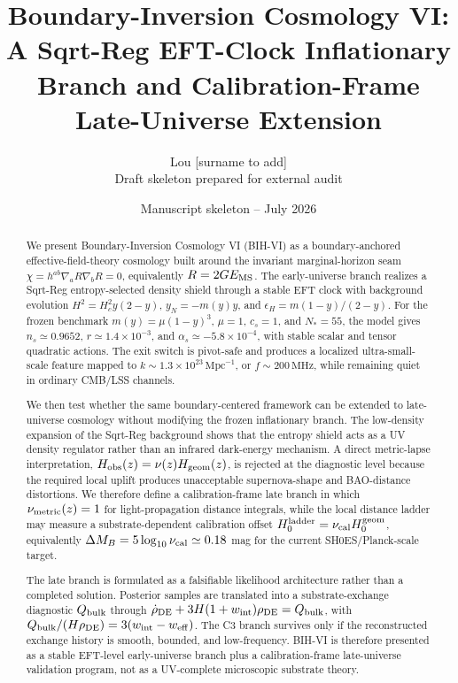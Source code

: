 \documentclass[11pt]{article}
\title{Boundary-Inversion Cosmology VI:\\A Sqrt-Reg EFT-Clock Inflationary Branch and Calibration-Frame Late-Universe Extension}
\author{Lou [surname to add]\\\small Draft skeleton prepared for external audit}
\date{Manuscript skeleton -- July 2026}
\begin{document}
\maketitle

\begin{abstract}
We present Boundary-Inversion Cosmology VI (BIH-VI) as a boundary-anchored effective-field-theory cosmology built around the invariant marginal-horizon seam $\chi=h^{ab}\nabla_aR\nabla_bR=0$, equivalently $R=2GE_{\rm MS}$. The early-universe branch realizes a Sqrt-Reg entropy-selected density shield through a stable EFT clock with background evolution $H^2=H_c^2y(2-y)$, $y_N=-m(y)y$, and $\epsilon_H=m(1-y)/(2-y)$. For the frozen benchmark $m(y)=\mu(1-y)^3$, $\mu=1$, $c_s=1$, and $N_*=55$, the model gives $n_s\simeq0.9652$, $r\simeq1.4\times10^{-3}$, and $\alpha_s\simeq-5.8\times10^{-4}$, with stable scalar and tensor quadratic actions. The exit switch is pivot-safe and produces a localized ultra-small-scale feature mapped to $k\sim1.3\times10^{23}\,\mathrm{Mpc}^{-1}$, or $f\sim200\,\mathrm{MHz}$, while remaining quiet in ordinary CMB/LSS channels.

We then test whether the same boundary-centered framework can be extended to late-universe cosmology without modifying the frozen inflationary branch. The low-density expansion of the Sqrt-Reg background shows that the entropy shield acts as a UV density regulator rather than an infrared dark-energy mechanism. A direct metric-lapse interpretation, $H_{\rm obs}(z)=\nu(z)H_{\rm geom}(z)$, is rejected at the diagnostic level because the required local uplift produces unacceptable supernova-shape and BAO-distance distortions. We therefore define a calibration-frame late branch in which $\nu_{\rm metric}(z)=1$ for light-propagation distance integrals, while the local distance ladder may measure a substrate-dependent calibration offset $H_0^{\rm ladder}=\nu_{\rm cal}H_0^{\rm geom}$, equivalently $\Delta M_B=5\log_{10}\nu_{\rm cal}\simeq0.18$ mag for the current SH0ES/Planck-scale target.

The late branch is formulated as a falsifiable likelihood architecture rather than a completed solution. Posterior samples are translated into a substrate-exchange diagnostic $Q_{\rm bulk}$ through $\dot\rho_{\rm DE}+3H(1+w_{\rm int})\rho_{\rm DE}=Q_{\rm bulk}$, with $Q_{\rm bulk}/(H\rho_{\rm DE})=3(w_{\rm int}-w_{\rm eff})$. The C3 branch survives only if the reconstructed exchange history is smooth, bounded, and low-frequency. BIH-VI is therefore presented as a stable EFT-level early-universe branch plus a calibration-frame late-universe validation program, not as a UV-complete microscopic substrate theory.
\end{abstract}
\end{document}
